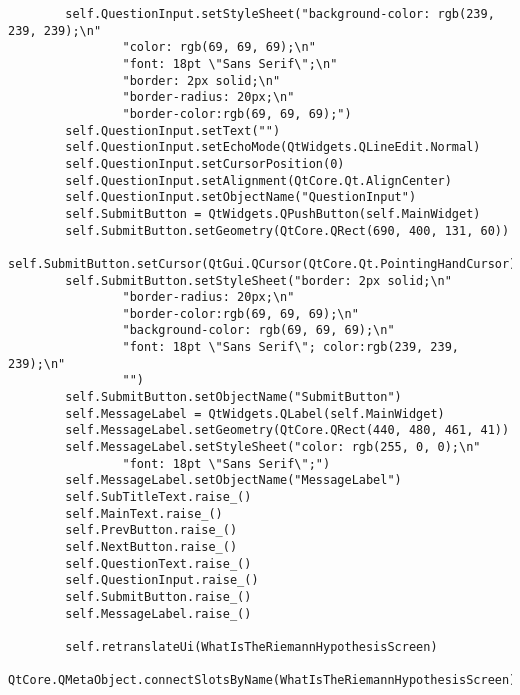 \documentclass{article}
\begin{document}
\begin{lstlisting}
        self.QuestionInput.setStyleSheet("background-color: rgb(239, 239, 239);\n"
                "color: rgb(69, 69, 69);\n"
                "font: 18pt \"Sans Serif\";\n"
                "border: 2px solid;\n"
                "border-radius: 20px;\n"
                "border-color:rgb(69, 69, 69);")
        self.QuestionInput.setText("")
        self.QuestionInput.setEchoMode(QtWidgets.QLineEdit.Normal)
        self.QuestionInput.setCursorPosition(0)
        self.QuestionInput.setAlignment(QtCore.Qt.AlignCenter)
        self.QuestionInput.setObjectName("QuestionInput")
        self.SubmitButton = QtWidgets.QPushButton(self.MainWidget)
        self.SubmitButton.setGeometry(QtCore.QRect(690, 400, 131, 60))
        self.SubmitButton.setCursor(QtGui.QCursor(QtCore.Qt.PointingHandCursor))
        self.SubmitButton.setStyleSheet("border: 2px solid;\n"
                "border-radius: 20px;\n"
                "border-color:rgb(69, 69, 69);\n"
                "background-color: rgb(69, 69, 69);\n"
                "font: 18pt \"Sans Serif\"; color:rgb(239, 239, 239);\n"
                "")
        self.SubmitButton.setObjectName("SubmitButton")
        self.MessageLabel = QtWidgets.QLabel(self.MainWidget)
        self.MessageLabel.setGeometry(QtCore.QRect(440, 480, 461, 41))
        self.MessageLabel.setStyleSheet("color: rgb(255, 0, 0);\n"
                "font: 18pt \"Sans Serif\";")
        self.MessageLabel.setObjectName("MessageLabel")
        self.SubTitleText.raise_()
        self.MainText.raise_()
        self.PrevButton.raise_()
        self.NextButton.raise_()
        self.QuestionText.raise_()
        self.QuestionInput.raise_()
        self.SubmitButton.raise_()
        self.MessageLabel.raise_()

        self.retranslateUi(WhatIsTheRiemannHypothesisScreen)
        QtCore.QMetaObject.connectSlotsByName(WhatIsTheRiemannHypothesisScreen)


\end{lstlisting}
\end{document}
